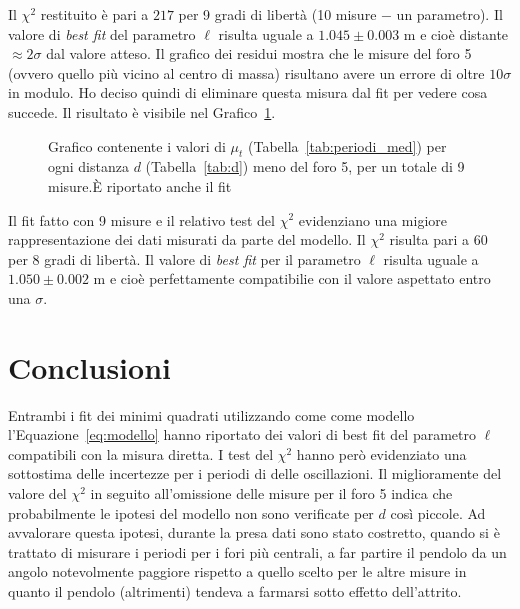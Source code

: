 \documentclass[a4paper,12pt]{article}
\begin{document}
Il $\chi^2$ restituito è pari a $217$ per 9 gradi di libertà (10 misure $-$ un parametro). Il valore di \textit{best fit} del parametro $\ell$ risulta uguale a $1.045 \pm 0.003$ m e cioè distante $\approx 2 \sigma$ dal valore atteso.
Il grafico dei residui mostra che le misure del foro 5 (ovvero quello più vicino al centro di massa) risultano avere un errore di oltre $10 \sigma$ in modulo.
Ho deciso quindi di eliminare questa misura dal fit per vedere cosa succede. Il risultato è visibile nel Grafico~\ref{fig:fit_9}.

\begin{figure}
    \centering
    \resizebox{1\textwidth}{!}{%
        
    }
    \caption{Grafico contenente i valori di $\mu_t$ (Tabella~\ref{tab:periodi_med}) per ogni distanza $d$ (Tabella~\ref{tab:d}) meno del foro 5, per un totale di 9 misure.\`E riportato anche il fit}%
    \label{fig:fit_9}
\end{figure}

Il fit fatto con 9 misure e il relativo test del $\chi^2$ evidenziano una migiore rappresentazione dei dati misurati da parte del modello. Il $\chi^2$ risulta pari a $60$ per 8 gradi di libertà. Il valore di \textit{best fit} per il parametro $\ell$ risulta uguale a $1.050 \pm 0.002$ m e cioè perfettamente compatibilie con il valore aspettato entro una $\sigma$.

\section{Conclusioni}

Entrambi i fit dei minimi quadrati utilizzando come come modello l'Equazione~\ref{eq:modello} hanno riportato dei valori di best fit del parametro $\ell$ compatibili con la misura diretta. I test del $\chi^2$ hanno però evidenziato una sottostima delle incertezze per i periodi di delle oscillazioni. Il miglioramente del valore del $\chi^2$ in seguito all'omissione delle misure per il foro 5 indica che probabilmente le ipotesi del modello non sono verificate per $d$ così piccole.
Ad avvalorare questa ipotesi, durante la presa dati sono stato costretto, quando si è trattato di misurare i periodi per i fori più centrali, a far partire il pendolo da un angolo notevolmente paggiore rispetto a quello scelto per le altre misure in quanto il pendolo (altrimenti) tendeva a farmarsi sotto effetto dell'attrito.
\end{document}
